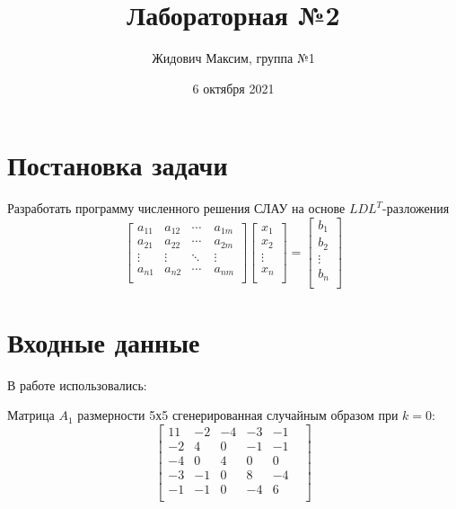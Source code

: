 \documentclass[12pt]{report}
\title{\vspace{-3cm}Лабораторная №2}
\author{Жидович Максим, группа №1}
\date{6 октября 2021}
\begin{document}
\maketitle

\section{Постановка задачи}

Разработать программу численного решения СЛАУ на основе $LDL^{T}$-разложения
\[
\begin{bmatrix}
a_{11} & a_{12}  & \cdots   & a_{1m}   \\
a_{21} & a_{22}  & \cdots   & a_{2m}  \\
\vdots & \vdots  & \ddots   & \vdots  \\
a_{n1} & a_{n2}  & \cdots\  & a_{nm}  \\
\end{bmatrix}
\begin{bmatrix}
x_{1} \\
x_{2} \\
\vdots \\
x_{n} \\
\end{bmatrix}
=
\begin{bmatrix}
b_{1} \\
b_{2} \\
\vdots \\
b_{n} \\
\end{bmatrix}
\]

\section{Входные данные}

В работе использовались:

Матрица $A_{1}$ размерности 5х5 сгенерированная случайным образом при $k = 0$:
\[
\begin{bmatrix}
      11 &        -2 &        -4 &        -3 &        -1 & \\
        -2 &         4 &         0 &        -1 &        -1 & \\
        -4 &         0 &         4 &         0 &         0 & \\ 
        -3 &        -1 &         0 &         8 &        -4 & \\ 
        -1 &        -1 &         0 &        -4 &         6 & \\
\end{bmatrix}
\]
\end{document}
